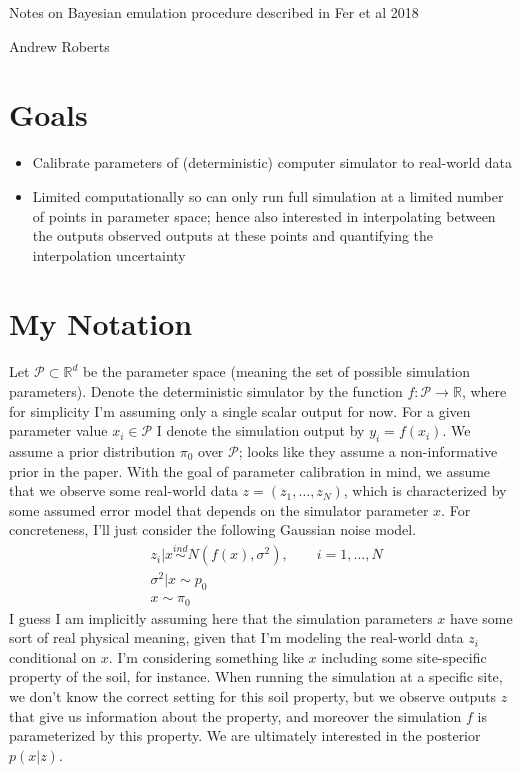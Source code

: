 \documentclass[12pt]{article}
\newcommand{\R}{\mathcal{R}}
\def\R{\mathbb{R}}
\begin{document}
\begin{center}
\Large
Notes on Bayesian emulation procedure described in Fer et al 2018
\end{center}

\begin{flushright}
Andrew Roberts
\end{flushright} 

\section{Goals}
\begin{itemize}
\item Calibrate parameters of (deterministic) computer simulator to real-world data
\item Limited computationally so can only run full simulation at a limited number of points in parameter space; hence also interested in interpolating between the 
outputs observed outputs at these points and quantifying the interpolation uncertainty
\end{itemize}

\section{My Notation}
Let $\mathcal{P} \subset \R^d$ be the parameter space (meaning the set of possible simulation parameters). Denote the deterministic simulator by the function $f: \mathcal{P} \to \R$, 
where for simplicity I'm assuming only a single scalar output for now. For a given parameter value $x_i \in \mathcal{P}$ I denote the simulation output by $y_i = f(x_i)$.
 We assume a prior distribution $\pi_0$ over $\mathcal{P}$; looks like they assume a non-informative prior in the paper. 
With the goal of parameter calibration in mind, we assume that we observe some real-world data $z = (z_1, \dots, z_N)$, which is characterized by some assumed error model that depends on the simulator parameter
$x$. For concreteness, I'll just consider the following Gaussian noise model. 
\begin{align*}
&z_i|x \overset{ind}{\sim} N(f(x), \sigma^2), \qquad i = 1, \dots, N \\
&\sigma^2|x \sim p_0 \\
&x \sim \pi_0
\end{align*}
I guess I am implicitly assuming here that the simulation parameters $x$ have some sort of real physical meaning, given that I'm modeling the real-world data $z_i$ conditional on $x$. 
I'm considering something like $x$ including some site-specific property of the soil, for instance. When running the simulation at a specific site, we don't know the correct setting for this soil 
property, but we observe outputs $z$ that give us information about the property, and moreover the simulation $f$ is parameterized by this property. We are ultimately interested in the 
posterior $p(x|z)$. 
\end{document}
